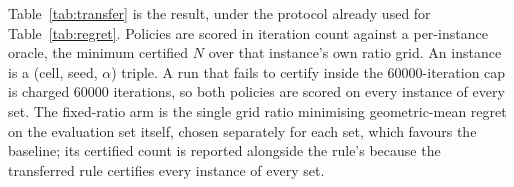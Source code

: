 Table~\ref{tab:transfer} is the result, under the protocol already used for
Table~\ref{tab:regret}. Policies are scored in iteration count against a
per-instance oracle, the minimum certified $N$ over that instance's own ratio
grid. An instance is a (cell, seed, $\alpha$) triple. A run that fails to
certify inside the 60000-iteration cap is charged 60000 iterations, so both
policies are scored on every instance of every set. The fixed-ratio arm is the
single grid ratio minimising geometric-mean regret on the evaluation set
itself, chosen separately for each set, which favours the baseline; its
certified count is reported alongside the rule's because the transferred rule
certifies every instance of every set.

